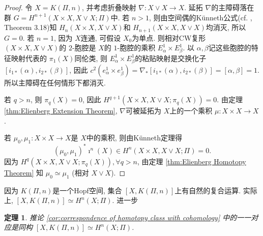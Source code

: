 \documentclass{ctexart}
\theoremstyle{plain}
\newtheorem{theorem}{定理}[section]
\theoremstyle{definition}
\begin{document}
        \begin{proof}
            令 $X=K(\Pi,n)$, 并考虑折叠映射 $\nabla: X\vee X\to X$. 延拓 $\nabla$的主障碍落在群 $G=H^{n+1}(X\times X, X\vee X; \Pi)$中. 若 $n>1$, 则由空间偶的Künneth公式(cf. \cite{Hatcher2002}, Theorem 3.18)知 $H_{n}(X\times X, X\vee X)$和 $H_{n+1}(X\times X, X\vee X)$均消灭, 所以 $G=0$. 若 $n=1$, 因为 $X$连通, 可假设 $X_0$为单点. 则相对CW复形 $(X\times X, X\vee X)$的 $2$-胞腔是 $X$的 $1$-胞腔的乘积 $E_{\alpha}^{1}\times E_{\beta}^{1}$. 以 $\alpha, \beta$记这些胞腔的特征映射代表的 $\pi_1(X)$同伦类, 则 $E_{\alpha}^{1}\times E_{\beta}^{1}$的粘贴映射是交换化子 $[i_{1*}(\alpha),i_{2*}(\beta)]$, 因此 $c^{2}(e_{\alpha}^{1}\times e_{\beta}^{1})=\nabla_{*}[i_{1*}(\alpha),i_{2*}(\beta)]=[\alpha,\beta]=1$. 所以主障碍在任何情形下都消灭.

            若 $q>n$, 则 $\pi_{q}(X)=0$, 因此 $H^{q+1}(X\times X, X\vee X; \pi_{q}(X))=0$. 由定理 \ref{thm:Elienberg Extension Theorem}, $\nabla$可被延拓为 $X$上的一个乘积 $\mu:X\times X\to X$.

            若 $\mu_0,\mu_1:X\times X\to X$是 $X$中的乘积, 则由Künneth定理得
            \begin{equation*}
                \left(\mu_0, \mu_1\right)^* \imath^n(X) \in H^n(X \times X, X \vee X ; \Pi)=0.
            \end{equation*}
            因为 $H^{q}(X\times X, X\vee X; \pi_{q}(X)), \forall q>n$, 由定理 \ref{thm:Elienberg Homotopy Theorem} 知 $\mu_0\simeq \mu_1$ (相对 $X\vee X$).
        \end{proof}

        因为 $K(\Pi, n)$是一个Hopf空间, 集合 $[X,K(\Pi, n)]$上有自然的复合运算. 实际上, $[X,K(\Pi, n)]\simeq H^{n}(X;\Pi)$. 进一步

        \begin{theorem}
            \label{thm:correspondence of homotopy class with cohomology is an isomorphism}
            推论 \ref{cor:correspondence of homotopy class with cohomology} 中的一一对应是同构 $[X, K(\Pi,n)]\simeq H^{n}(X;\Pi)$.
        \end{theorem}
\end{document}
